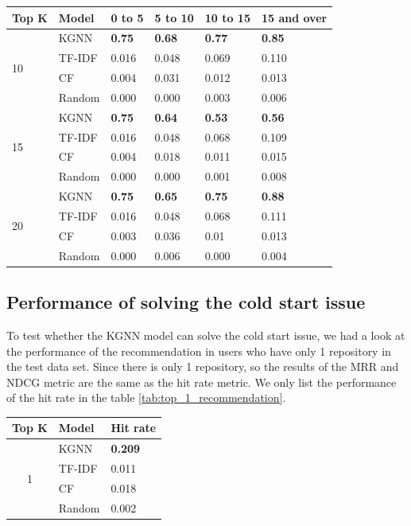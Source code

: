 \documentclass[11pt,twoside]{report}
\begin{document}
\begin{center}
    \begin{tabular}{l | l | l | l | l | l}
    \hline
    Top K & Model & 0 to 5 & 5 to 10 & 10 to 15 & 15 and over \\
    \hline
    \multirow{4}{*}{10} 
    & KGNN & \textbf{0.75} & \textbf{0.68} & \textbf{0.77} & \textbf{0.85} \\
    & TF-IDF & 0.016 & 0.048 & 0.069 & 0.110 \\
    & CF & 0.004 & 0.031 & 0.012 & 0.013 \\
    & Random & 0.000 & 0.000 & 0.003 & 0.006 \\
    \hline
    \multirow{4}{*}{15}
    & KGNN & \textbf{0.75} & \textbf{0.64} & \textbf{0.53} & \textbf{0.56} \\
    & TF-IDF & 0.016 & 0.048 & 0.068 & 0.109 \\
    & CF & 0.004 & 0.018 & 0.011 & 0.015 \\
    & Random & 0.000 & 0.000 & 0.001 & 0.008 \\
    \hline
    \multirow{4}{*}{20}
    & KGNN & \textbf{0.75} & \textbf{0.65} & \textbf{0.75} & \textbf{0.88} \\
    & TF-IDF & 0.016 & 0.048 & 0.068 & 0.111 \\
    & CF & 0.003 & 0.036 & 0.01 & 0.013 \\
    & Random & 0.000 & 0.006 & 0.000 & 0.004 \\
    \end{tabular}
    \label{tab:ndcg_group_performance}
\end{center}

\subsection{Performance of solving the cold start issue}
To test whether the KGNN model can solve the cold start issue, we had a look at the performance of the recommendation in users who have only 1 repository in the test data set. Since there is only 1 repository, so the results of the MRR and NDCG metric are the same as the hit rate metric. We only list the performance of the hit rate in the table \ref{tab:top_1_recommendation}.

\begin{center}
    \begin{tabular}{c | l | l}
    \hline
    Top K & Model & Hit rate \\
    \hline
    \multirow{4}{*}{1} 
    & KGNN & \textbf{0.209} \\
    & TF-IDF & 0.011 \\
    & CF & 0.018 \\
    & Random & 0.002 \\
    \end{tabular}
    \label{tab:top_1_recommendation}
\end{center}
\end{document}

